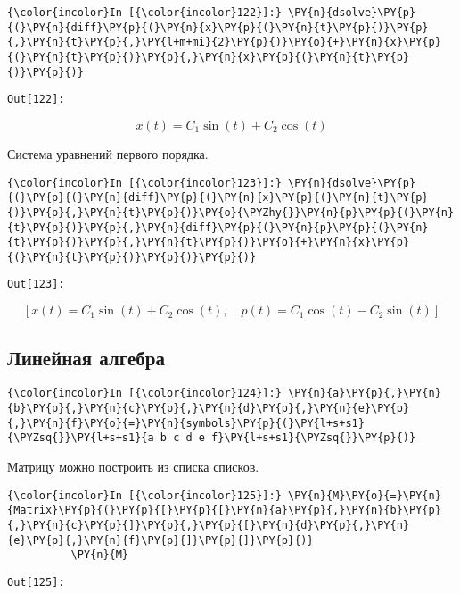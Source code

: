     \begin{Verbatim}[commandchars=\\\{\}]
{\color{incolor}In [{\color{incolor}122}]:} \PY{n}{dsolve}\PY{p}{(}\PY{n}{diff}\PY{p}{(}\PY{n}{x}\PY{p}{(}\PY{n}{t}\PY{p}{)}\PY{p}{,}\PY{n}{t}\PY{p}{,}\PY{l+m+mi}{2}\PY{p}{)}\PY{o}{+}\PY{n}{x}\PY{p}{(}\PY{n}{t}\PY{p}{)}\PY{p}{,}\PY{n}{x}\PY{p}{(}\PY{n}{t}\PY{p}{)}\PY{p}{)}
\end{Verbatim}
\texttt{\color{outcolor}Out[{\color{outcolor}122}]:}
    
    \[x{\left (t \right )} = C_{1} \sin{\left (t \right )} + C_{2} \cos{\left (t \right )}\]

    

    Система уравнений первого порядка.

    \begin{Verbatim}[commandchars=\\\{\}]
{\color{incolor}In [{\color{incolor}123}]:} \PY{n}{dsolve}\PY{p}{(}\PY{p}{(}\PY{n}{diff}\PY{p}{(}\PY{n}{x}\PY{p}{(}\PY{n}{t}\PY{p}{)}\PY{p}{,}\PY{n}{t}\PY{p}{)}\PY{o}{\PYZhy{}}\PY{n}{p}\PY{p}{(}\PY{n}{t}\PY{p}{)}\PY{p}{,}\PY{n}{diff}\PY{p}{(}\PY{n}{p}\PY{p}{(}\PY{n}{t}\PY{p}{)}\PY{p}{,}\PY{n}{t}\PY{p}{)}\PY{o}{+}\PY{n}{x}\PY{p}{(}\PY{n}{t}\PY{p}{)}\PY{p}{)}\PY{p}{)}
\end{Verbatim}
\texttt{\color{outcolor}Out[{\color{outcolor}123}]:}
    
    \[\left [ x{\left (t \right )} = C_{1} \sin{\left (t \right )} + C_{2} \cos{\left (t \right )}, \quad p{\left (t \right )} = C_{1} \cos{\left (t \right )} - C_{2} \sin{\left (t \right )}\right ]\]

    

\subsection{Линейная алгебра}
\label{sympy12}

    \begin{Verbatim}[commandchars=\\\{\}]
{\color{incolor}In [{\color{incolor}124}]:} \PY{n}{a}\PY{p}{,}\PY{n}{b}\PY{p}{,}\PY{n}{c}\PY{p}{,}\PY{n}{d}\PY{p}{,}\PY{n}{e}\PY{p}{,}\PY{n}{f}\PY{o}{=}\PY{n}{symbols}\PY{p}{(}\PY{l+s+s1}{\PYZsq{}}\PY{l+s+s1}{a b c d e f}\PY{l+s+s1}{\PYZsq{}}\PY{p}{)}
\end{Verbatim}

    Матрицу можно построить из списка списков.

    \begin{Verbatim}[commandchars=\\\{\}]
{\color{incolor}In [{\color{incolor}125}]:} \PY{n}{M}\PY{o}{=}\PY{n}{Matrix}\PY{p}{(}\PY{p}{[}\PY{p}{[}\PY{n}{a}\PY{p}{,}\PY{n}{b}\PY{p}{,}\PY{n}{c}\PY{p}{]}\PY{p}{,}\PY{p}{[}\PY{n}{d}\PY{p}{,}\PY{n}{e}\PY{p}{,}\PY{n}{f}\PY{p}{]}\PY{p}{]}\PY{p}{)}
          \PY{n}{M}
\end{Verbatim}
\texttt{\color{outcolor}Out[{\color{outcolor}125}]:}
    
